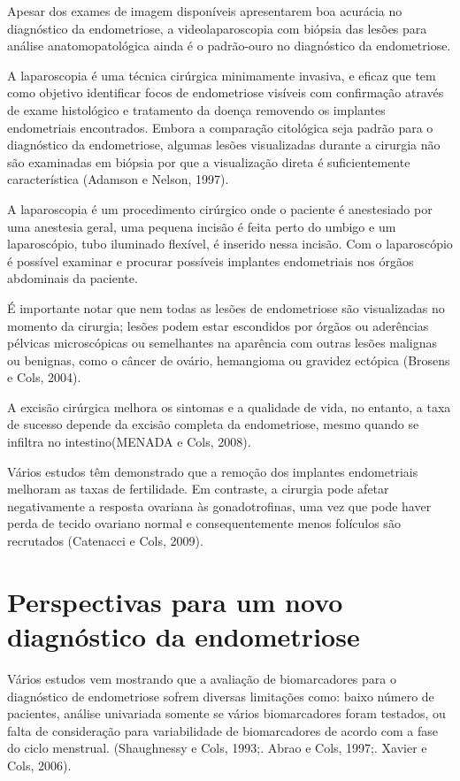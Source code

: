 \documentclass[12pt]{article} %
\begin{document}
Apesar dos exames de imagem disponíveis apresentarem boa acurácia no diagnóstico da endometriose, a videolaparoscopia com biópsia das lesões para análise anatomopatológica ainda é o padrão-ouro no diagnóstico da endometriose.

A laparoscopia é uma técnica cirúrgica minimamente invasiva, e eficaz que tem como objetivo  identificar focos de endometriose visíveis com confirmação através de exame histológico e tratamento da doença removendo os implantes endometriais encontrados. Embora a comparação citológica seja padrão para
o diagnóstico da endometriose, algumas lesões visualizadas durante a
cirurgia não são examinadas em biópsia por que a visualização direta é
suficientemente característica (Adamson e Nelson, 1997). 

A laparoscopia é um procedimento cirúrgico onde o paciente é
anestesiado por uma anestesia geral, uma pequena incisão é feita
perto do umbigo e um laparoscópio, tubo iluminado flexível, é inserido
nessa incisão. Com o laparoscópio é possível examinar e procurar
possíveis implantes endometriais nos órgãos abdominais da paciente.

É importante notar que nem todas as lesões de endometriose são
visualizadas no momento da cirurgia; lesões podem estar escondidos por
órgãos ou aderências pélvicas microscópicas ou semelhantes na
aparência com outras lesões malignas ou benignas, como o câncer de
ovário, hemangioma ou gravidez ectópica (Brosens e Cols, 2004).

A excisão cirúrgica
melhora os sintomas e a qualidade de vida, no entanto, a taxa de
sucesso depende da excisão completa da endometriose, mesmo
quando se infiltra no intestino(MENADA e Cols, 2008).

Vários estudos têm demonstrado que a remoção dos implantes
endometriais melhoram as taxas de fertilidade. Em contraste, a
cirurgia pode afetar negativamente a resposta ovariana às gonadotrofinas, uma vez que pode haver perda de tecido ovariano normal e consequentemente menos folículos são recrutados (Catenacci e Cols, 2009).


\section{Perspectivas para um novo diagnóstico da endometriose}

Vários estudos vem mostrando que a avaliação de biomarcadores para o diagnóstico de endometriose sofrem diversas limitações como: baixo número de pacientes, análise univariada somente se vários biomarcadores foram testados, ou falta de consideração para variabilidade de biomarcadores de acordo com a fase do ciclo menstrual. (Shaughnessy e Cols, 1993;. Abrao e Cols, 1997;. Xavier e Cols, 2006).
\end{document}
